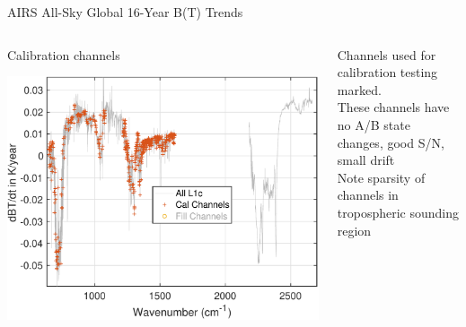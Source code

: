 \documentclass[10pt,t]{beamer}
\begin{document}
\begin{frame}[label={sec:org6583852}]{AIRS All-Sky Global 16-Year B(T) Trends}
\vspace{-0.25in}

\begin{columns}
\begin{column}{0.55\columnwidth}
\begin{block}{\footnotesize Calibration channels}
\vspace{-0.1in}
\begin{center}
\includegraphics[width=0.75\linewidth]{./Figs/Pdf/rand_global_trend_l1c_overview_calfit_marked.pdf}
\end{center}
\end{block}
\end{column}


\begin{column}{0.55\columnwidth}
\begin{block}{\footnotesize}
\begin{footnotesize}
Channels used for calibration testing marked.\\
\vspace{0.05in}
These channels have no A/B state changes, good S/N, small drift\\
\vspace{0.05in}
Note sparsity of \cd channels in tropospheric sounding region\\
\end{footnotesize}
\end{block}
\end{column}
\end{columns}
\end{frame}
\end{document}
